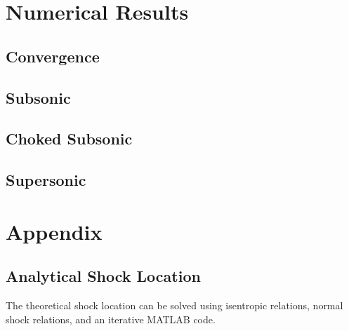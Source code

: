 \documentclass[11pt]{article}%
\numberwithin{equation}{section}
\begin{document}
\section{Numerical Results}

\subsection{Convergence}

\subsection{Subsonic}

\subsection{Choked Subsonic}

\subsection{Supersonic}

\section{Appendix}
\subsection{Analytical Shock Location}

The theoretical shock location can be solved using isentropic relations, normal shock relations, and an iterative MATLAB code.
\end{document}
